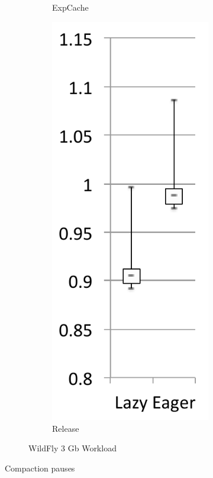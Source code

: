 \documentclass[sigplan,10pt,review,anonymous]{acmart}\settopmatter{printfolios=true,printccs=false,printacmref=false}
\begin{document}
\begin{figure}[bth]
\begin{subfigure}[b]{.48\textwidth}
\begin{subfigure}[b]{.24\textwidth}
    		\caption{ExpCache}
    	\end{subfigure}%
    	\begin{subfigure}[b]{.24\textwidth}
    		\includegraphics[width=\linewidth]{figures/wildflyRelease} 
    		\caption{Release}
   	\end{subfigure}   
	\caption*{WildFly 3 Gb Workload}
	\end{subfigure}	   
	\vspace{-0.8cm}
	\caption{Compaction pauses\vspace{-0.2cm}}
	\label{fig:compactPause}
\end{figure}
\end{document}
